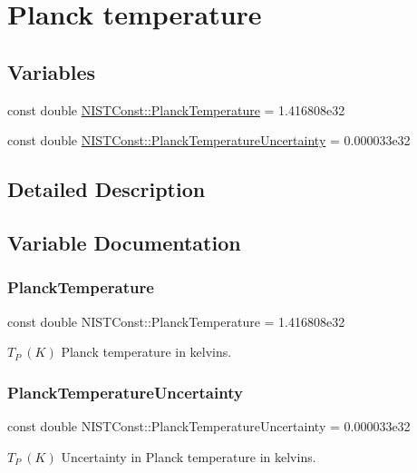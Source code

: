 \hypertarget{group___n_i_s_t_const-_planck_temperature}{}\section{Planck temperature}
\label{group___n_i_s_t_const-_planck_temperature}
\subsection*{Variables}
\begin{DoxyCompactItemize}
\item 
const double \hyperlink{group___n_i_s_t_const-_planck_temperature_ga19bf9bbc3c9fee330296d21ed42fbb51}{N\+I\+S\+T\+Const\+::\+Planck\+Temperature} = 1.\+416808e32
\item 
const double \hyperlink{group___n_i_s_t_const-_planck_temperature_gaf4a05bd7cc77c51eb7f8258fab36d521}{N\+I\+S\+T\+Const\+::\+Planck\+Temperature\+Uncertainty} = 0.\+000033e32
\end{DoxyCompactItemize}


\subsection{Detailed Description}


\subsection{Variable Documentation}
\mbox{\label{group___n_i_s_t_const-_planck_temperature_ga19bf9bbc3c9fee330296d21ed42fbb51}} 
\subsubsection{\texorpdfstring{Planck\+Temperature}{PlanckTemperature}}
{\footnotesize\ttfamily const double N\+I\+S\+T\+Const\+::\+Planck\+Temperature = 1.\+416808e32}

$T_P \ (K)$ Planck temperature in kelvins. \mbox{\label{group___n_i_s_t_const-_planck_temperature_gaf4a05bd7cc77c51eb7f8258fab36d521}} 
\subsubsection{\texorpdfstring{Planck\+Temperature\+Uncertainty}{PlanckTemperatureUncertainty}}
{\footnotesize\ttfamily const double N\+I\+S\+T\+Const\+::\+Planck\+Temperature\+Uncertainty = 0.\+000033e32}

$T_P \ (K)$ Uncertainty in Planck temperature in kelvins. 